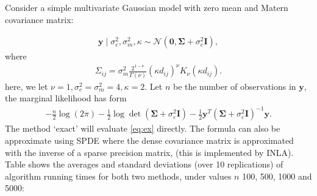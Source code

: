 \documentclass{article}
\begin{document}
Consider a simple multivariate Gaussian model with zero mean and Matern covariance matrix:

\begin{align*}
    \boldsymbol{y} \mid \sigma_e^2, \sigma_m^2, \kappa \sim \mathcal{N}(\mathbf{0}, \mathbf{\Sigma} + \sigma_e^2 \mathbf{I}),
\end{align*}
where 
\begin{align*}
    \Sigma_{ij}=\sigma_m^2 \frac{2^{1-\nu}}{\Gamma(\nu)}\left(\kappa{d_{ij}}\right)^\nu K_\nu\left( \kappa{d_{ij}}\right).
\end{align*}
here, we let $\nu = 1, \sigma_e^2= \sigma_m^2 = 4, \kappa = 2$. Let $n$ be the number of observations in $\boldsymbol{y}$, the marginal likelihood has form 
\begin{align}
\label{eq:ex}
    -\frac{n}{2}\log(2\pi) - \frac{1}{2}\log \det (\mathbf{\Sigma}+\sigma_{\varepsilon}^2 \mathbf{I}) - \frac{1}{2}\boldsymbol{y}^T (\mathbf{\Sigma}+\sigma_{\varepsilon}^2 \mathbf{I})^{-1}\boldsymbol{y}.
\end{align}
The method `exact' will evaluate \eqref{eq:ex} directly. The formula can also be approximate using SPDE where the dense covariance matrix is approximated with the inverse of a sparse precision matrix, (this is implemented by INLA). Table shows the averages and standard deviations (over 10 replications) of algorithm running times for both two methods, under values $n$ 100, 500, 1000 and 5000:
\end{document}
